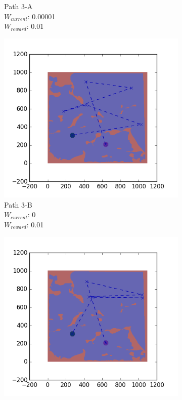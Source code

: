 \documentclass{tamuccthesis}
\begin{document}
\begin{figure}
\begin{subfigure}[b]{0.24\textwidth}
        \caption{{\small Path 3-A \\ $W_{current}$: 0.00001 \\ $W_{reward}$: 0.01}}   
        \label{fig:Path_3-A_upReward_Work}
    \end{subfigure}
    \begin{subfigure}[b]{0.24\textwidth}
        \centering
        \includegraphics[width=\textwidth,trim={4cm 3cm 2cm 3cm},clip]{EXP3RG_PathCb_-1_-1_0_0d01.png}
        \caption{{\small Path 3-B \\ $W_{current}$: 0 \\ $W_{reward}$: 0.01}}    
        \label{fig:Path_3-B_upReward_noWork}
    \end{subfigure}
    \begin{subfigure}[b]{0.24\textwidth}  
        \centering 
        \includegraphics[width=\textwidth,trim={4cm 3cm 2cm 3cm},clip]{EXP3RG_PathCb_-1_-1_-1_0d01.png}

\end{subfigure}
\end{figure}
\end{document}
